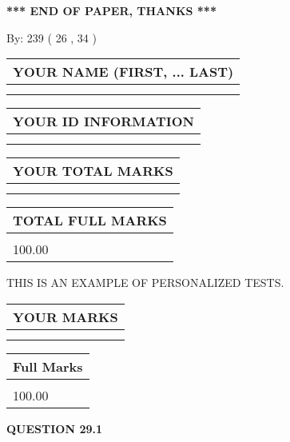 \documentclass[12pt]{article}
\begin{document}
 

 
\vspace{0.3in}
   
   
 \vspace{0.2in}
 
   
   
   
   
\vspace{1.0in} 
{\textbf{\large{ *** END OF PAPER, THANKS *** }}} 
   
   
\hspace{1.0in} By: 
 239 ( 26 ,  34 )
   
   
   
   
\newpage 
\setcounter{page}{ 
    29001 } 
   
   
   
   
\noindent\begin{tabular}{|l|}
\hline
YOUR NAME (FIRST, ... LAST)  \\
\hline
 \\ 
 \\ 
\hline
\end{tabular}
\hspace{0.05in} \begin{tabular}{|l|}
\hline
 YOUR   ID   INFORMATION  \\
\hline
 \\ 
 \\ 
\hline
\end{tabular}
   
   
\vspace{0.2in}\noindent\begin{tabular}{|l|}
\hline
YOUR TOTAL MARKS  \\
\hline
 \\ 
 \\ 
\hline
\end{tabular}
\hspace{0.05in} \begin{tabular}{|l|}
\hline
TOTAL FULL MARKS  \\
\hline
 \\ 
100.00 \\
\hline
\end{tabular}
   
   
 \vspace{0.2in}
{\Huge  THIS IS AN EXAMPLE OF}
{\Huge  PERSONALIZED TESTS. }
   
   
  
\vspace{0.2in}
  
\noindent\begin{tabular}{|l|}
\hline
 YOUR MARKS  \\
\hline
 \\ 
 \\ 
\hline
\end{tabular}
\hspace{0.05in} \begin{tabular}{|l|}
\hline
 Full Marks  \\
\hline
 \\ 
100.00 \\
\hline
\end{tabular}
{\textbf{\Large{QUESTION
29.1 
}}}
  
\end{document}
